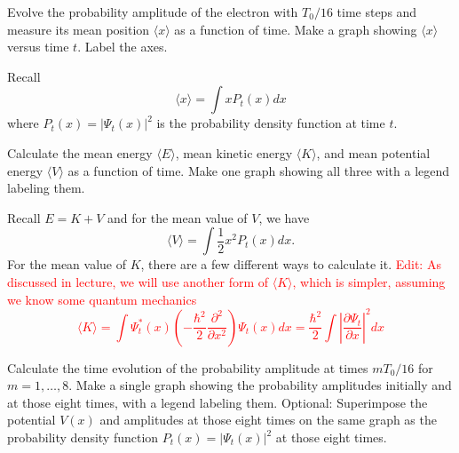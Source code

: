 \begin{solution}
\end{solution}

\begin{problem}[10]
Evolve the probability amplitude of the electron with $T_0/16$ time steps and measure its mean position $\langle x \rangle$ as a function of time.
Make a graph showing $\langle x \rangle$ versus time $t$.
Label the axes.

\begin{hint}
  Recall
  \begin{equation}
    \langle x \rangle = \int x P_t(x) dx
  \end{equation}
  where $P_t(x) = |\Psi_t(x)|^2$ is the probability density function at time $t$.
\end{hint}
\end{problem}

\begin{solution}
\end{solution}

\begin{problem}[10]
Calculate the mean energy $\langle E \rangle$, mean kinetic energy $\langle K \rangle$, and mean potential energy $\langle V \rangle$ as a function of time.
Make one graph showing all three with a legend labeling them.

\begin{hint}
  Recall $E = K + V$ and for the mean value of $V$, we have
  \begin{equation}
    \langle V\rangle = \int \frac{1}{2}x^2 P_t(x) dx.
  \end{equation}
  For the mean value of $K$, there are a few different ways to calculate it.
  \textcolor{red}{
    Edit: As discussed in lecture, we will use another form of $\langle K\rangle$, which is simpler, assuming we know some quantum mechanics
    \begin{equation}
      \langle K\rangle = \int \Psi_t^\ast(x) \left(- \frac{\hbar^2}{2} \frac{\partial^2}{\partial x^2}\right) \Psi_t(x) dx = \frac{\hbar^2}{2} \int \left|\frac{\partial\Psi_t}{\partial x}\right|^2  dx
    \end{equation}
  }
\end{hint}
\end{problem}

\begin{solution}
\end{solution}

\begin{problem}[10]
Calculate the time evolution of the probability amplitude at times $mT_0/16$ for $m=1, \dots, 8$.
Make a single graph showing the probability amplitudes initially and at those eight times, with a legend labeling them.
Optional: Superimpose the potential $V(x)$ and amplitudes at those eight times on the same graph as the probability density function $P_t(x) = |\Psi_t(x)|^2$ at those eight times.
\end{problem}


